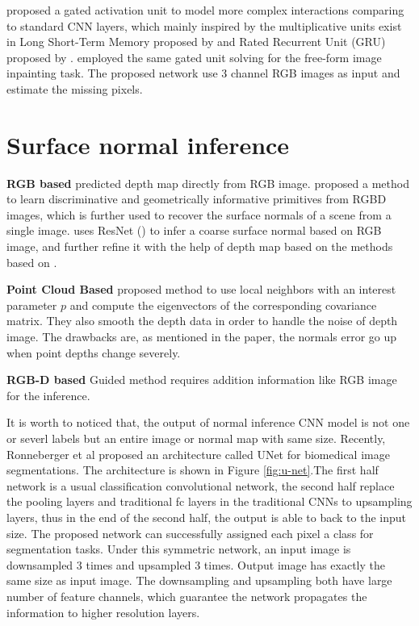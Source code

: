 \cite{gated_activation} proposed a gated activation unit to model more complex interactions comparing to standard CNN layers, which mainly inspired by the multiplicative units exist in Long Short-Term Memory proposed by \cite{lstm} and Rated Recurrent Unit (GRU) proposed by \cite{gru}. 
\cite{gconv} employed the same gated unit solving for the free-form image inpainting task. The proposed network use 3 channel RGB images as input and estimate the missing pixels. 




\section{Surface normal inference}
\textbf{RGB based}  
\cite{Eigen} predicted depth map directly from RGB image. 
\cite{geometry_based_solution} proposed a method to learn discriminative and geometrically informative primitives from RGBD images, which is further used to recover the surface normals of a scene from a single image. 
\cite{GeoNet} uses ResNet (\cite{resnet}) to infer a coarse surface normal based on RGB image, and further refine it with the help of depth map based on the methods based on \cite{geometry_based_solution}.


\textbf{Point Cloud Based} 
\cite{Holzer.S} proposed method to use local neighbors with an interest parameter $ p $ and compute the eigenvectors of the corresponding covariance matrix. They also smooth the depth data in order to handle the noise of depth image. The drawbacks are, as mentioned in the paper, the normals error go up when point depths change severely. 

\textbf{RGB-D based}
Guided method \cite{guided} requires addition information like RGB image for the inference.




 

It is worth to noticed that, the output of normal inference CNN model is not one or severl labels but an entire image or normal map with same size. 
Recently, Ronneberger et al proposed an architecture called UNet \cite{unet} for biomedical image segmentations. The architecture is shown in Figure \ref{fig:u-net}.The first half network is a usual classification convolutional network, the second half replace the pooling layers and traditional fc layers in the traditional CNNs to upsampling layers, thus in the end of the second half, the output is able to back to the input size. The proposed network can successfully assigned each pixel a class for segmentation tasks. Under this symmetric network, an input image is downsampled 3 times and upsampled 3 times. Output image has exactly the same size as input image. The downsampling and upsampling both have large number of feature channels, which guarantee the network propagates the information to higher resolution layers.





